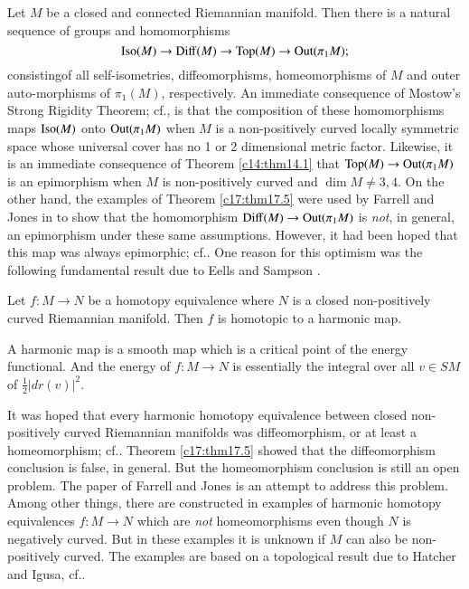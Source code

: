Let $M$ be a closed and connected Riemannian manifold. Then there is a
natural sequence of groups and homomorphisms
$$
\operatorname{Iso}(M)\to \operatorname{Diff}(M)\to \operatorname{Top}(M)\to \operatorname{Out}(\pi_{1}M);
$$
consisting\pageoriginale of all self-isometries, diffeomorphisms,
homeomorphisms of $M$ and outer auto-morphisms of $\pi_{1}(M)$,
respectively. An immediate consequence of Mostow's Strong Rigidity
Theorem; cf.\@ \cite{75}, is that the composition of these
homomorphisms maps $\operatorname{Iso}(M)$ onto $\operatorname{Out}(\pi_{1}M)$ when $M$ is a
non-positively curved locally symmetric space whose universal cover
has no 1 or 2 dimensional metric factor. Likewise, it is an immediate
consequence of Theorem \ref{c14:thm14.1} that $\operatorname{Top}(M)\to
\operatorname{Out}(\pi_{1}M)$ is an epimorphism when $M$ is non-positively curved
and $\dim M\neq 3,4$. On the other hand, the examples of Theorem
\ref{c17:thm17.5} were used by Farrell and Jones in \cite{41} to show
that the homomorphism $\operatorname{Diff}(M)\to \operatorname{Out}(\pi_{1}M)$ is {\em not}, in
general, an epimorphism under these same assumptions. However, it had
been hoped that this map was always epimorphic; cf.\@ \cite{86}. One
reason for this optimism was the following fundamental result due to
Eells and Sampson \cite{28}.

\begin{thm}\label{c20:thm20.3}
Let $f:M\to N$ be a homotopy equivalence where $N$ is a closed
non-positively curved Riemannian manifold. Then $f$ is homotopic to a
harmonic map.
\end{thm}

\begin{remark*}
A harmonic map is a smooth map which is a critical point of the energy
functional. And the energy of $f:M\to N$ is essentially the integral
over all $v\in SM$ of $\frac{1}{2}|dr(v)|^{2}$.
\end{remark*}

It was hoped that every harmonic homotopy equivalence between closed
non-positively curved Riemannian manifolds was diffeomor\-phi\-sm, or at
least a homeomorphism; cf.\@ \cite[Problems 5.4 and 5.5]{27}. Theorem
\ref{c17:thm17.5} showed that the diffeomorphism conclusion is false,
in general. But the homeomorphism conclusion is still an open
problem. The paper \cite{50} of Farrell and Jones is an attempt to
address this problem. Among other things, there are constructed in
\cite{50} examples of harmonic homotopy equivalences $f:M\to N$ which
are {\em not} homeomorphisms even though $N$ is negatively curved. But
in these examples it is unknown if $M$ can also be non-positively
curved. The examples are based on a topological result due to Hatcher
and Igusa, cf.\@ \cite[\S 4]{57}.

